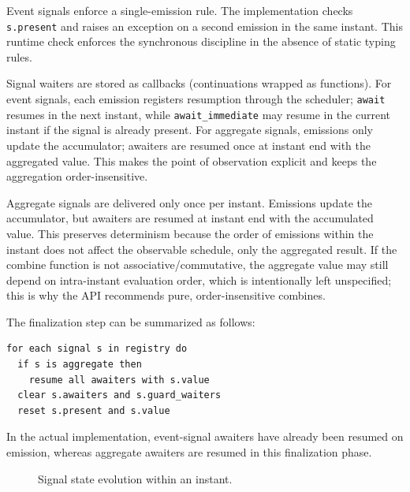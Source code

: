Event signals enforce a single-emission rule. The implementation checks
\texttt{s.present} and raises an exception on a second emission in the same
instant. This runtime check enforces the synchronous discipline in the absence
of static typing rules.

Signal waiters are stored as callbacks (continuations wrapped as functions).
For event signals, each emission registers resumption through the scheduler;
\texttt{await} resumes in the next instant, while \texttt{await\_immediate} may
resume in the current instant if the signal is already present. For aggregate
signals, emissions only update the accumulator; awaiters are resumed once at
instant end with the aggregated value. This makes the point of observation
explicit and keeps the aggregation order-insensitive.

Aggregate signals are delivered only once per instant. Emissions update the
accumulator, but awaiters are resumed at instant end with the accumulated
value. This preserves determinism because the order of emissions within the
instant does not affect the observable schedule, only the aggregated result.
If the combine function is not associative/commutative, the aggregate value may
still depend on intra-instant evaluation order, which is intentionally left
unspecified; this is why the API recommends pure, order-insensitive combines.

The finalization step can be summarized as follows:
\begin{lstlisting}[style=tempo]
for each signal s in registry do
  if s is aggregate then
    resume all awaiters with s.value
  clear s.awaiters and s.guard_waiters
  reset s.present and s.value
\end{lstlisting}
In the actual implementation, event-signal awaiters have already been resumed
on emission, whereas aggregate awaiters are resumed in this finalization phase.

\begin{figure}[t]
\centering
{}
\caption{Signal state evolution within an instant.}
\label{fig:signal-state}
\end{figure}

